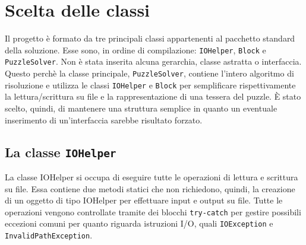 %
%

\section{Scelta delle classi}
Il progetto è formato da tre principali classi appartenenti al pacchetto standard della soluzione. Esse sono, in ordine di compilazione: \texttt{IOHelper}, \texttt{Block} e \texttt{PuzzleSolver}.
Non è stata inserita alcuna gerarchia, classe astratta o interfaccia. Questo perchè la classe principale, \texttt{PuzzleSolver}, contiene l'intero algoritmo di risoluzione e utilizza le classi \texttt{IOHelper} e \texttt{Block} per semplificare rispettivamente la lettura/scrittura su file e la rappresentazione di una tessera del puzzle. \`{E} stato scelto, quindi, di mantenere una struttura semplice in quanto un eventuale inserimento di un'interfaccia sarebbe risultato forzato.

\subsection{La classe \texttt{IOHelper}}
La classe IOHelper si occupa di eseguire tutte le operazioni di lettura e scrittura su file. Essa contiene due metodi statici che non richiedono, quindi, la creazione di un oggetto di tipo IOHelper per effettuare input e output su file. Tutte le operazioni vengono controllate tramite dei blocchi \texttt{try-catch} per gestire possibili eccezioni comuni per quanto riguarda istruzioni I/O, quali \texttt{IOException} e \texttt{InvalidPathException}.

